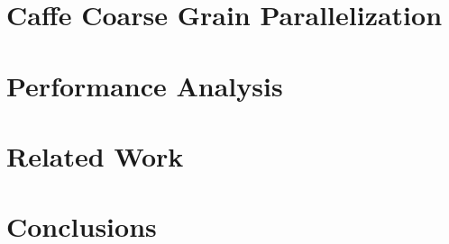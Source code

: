 \documentclass[preprint,nocopyrightspace]{sigplanconf}
\begin{document}
\section{Caffe Coarse Grain Parallelization}
 

\section{Performance Analysis}
 

\section{Related Work}


\section{Conclusions}






{}




%
\end{document}
